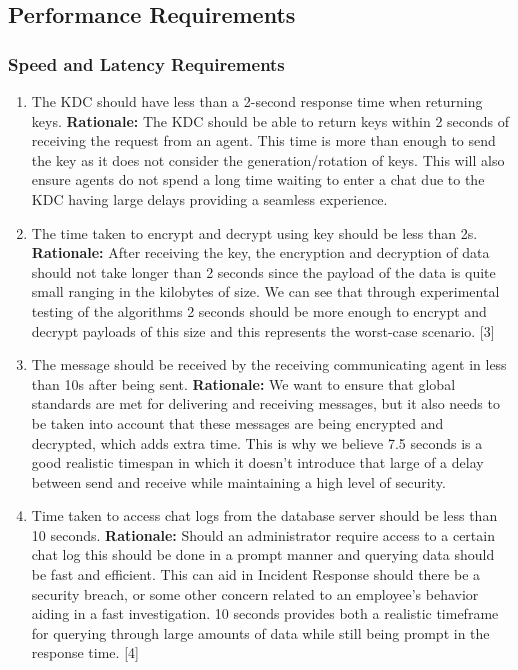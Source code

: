 \documentclass[]{article}
\begin{document}

\subsection{Performance Requirements}
\label{sub:performance_requirements}

\subsubsection{Speed and Latency Requirements}
\label{ssub:speed_and_latency_requirements}
\begin{enumerate}[{PR-SL}1. ]
	\item The KDC should have less than a 2-second response time when returning keys. \newline
	      \textbf{Rationale:} The KDC should be able to return keys within 2 seconds of receiving the request from an agent. This time is more than enough to send the key as it does not consider the generation/rotation of keys. This will also ensure agents do not spend a long time waiting to enter a chat due to the KDC having large delays providing a seamless experience.
	\item The time taken to encrypt and decrypt using key should be less than 2s. \newline
	      \textbf{Rationale:} After receiving the key, the encryption and decryption of data should not take longer than 2 seconds since the payload of the data is quite small ranging in the kilobytes of size. We can see that through experimental testing of the algorithms 2 seconds should be more enough to encrypt and decrypt payloads of this size and this represents the worst-case scenario. [3]

	\item The message should be received by the receiving communicating agent in less than  10s after being sent. \newline
	      \textbf{Rationale:} We want to ensure that global standards are met for delivering and receiving messages, but it also needs to be taken into account that these messages are being encrypted and decrypted, which adds extra time. This is why we believe 7.5 seconds is a good realistic timespan in which it doesn’t introduce that large of a delay between send and receive while maintaining a high level of security.

	\item Time taken to access chat logs from the database server should be less than 10 seconds. \newline
	      \textbf{Rationale:} Should an administrator require access to a certain chat log this should be done in a prompt manner and querying data should be fast and efficient. This can aid in Incident Response should there be a security breach, or some other concern related to an employee’s behavior aiding in a fast investigation. 10 seconds provides both a realistic timeframe for querying through large amounts of data while still being prompt in the response time. [4]
\end{enumerate}
\end{document}
